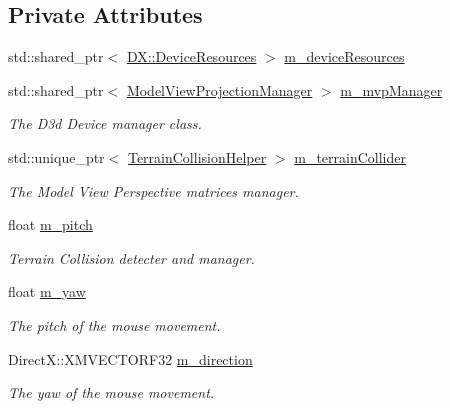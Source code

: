 \subsection*{Private Attributes}
\begin{DoxyCompactItemize}
\item 
std\+::shared\+\_\+ptr$<$ \mbox{\hyperlink{class_d_x_1_1_device_resources}{D\+X\+::\+Device\+Resources}} $>$ \mbox{\hyperlink{class_camera_helper_a68562f65262d3c90532df0a194624ec9}{m\+\_\+device\+Resources}}
\item 
std\+::shared\+\_\+ptr$<$ \mbox{\hyperlink{class_model_view_projection_manager}{Model\+View\+Projection\+Manager}} $>$ \mbox{\hyperlink{class_camera_helper_a10d96783299a8c958f84d46542a3d93f}{m\+\_\+mvp\+Manager}}
\begin{DoxyCompactList}\small\item\em The D3d Device manager class. \end{DoxyCompactList}\item 
std\+::unique\+\_\+ptr$<$ \mbox{\hyperlink{class_terrain_collision_helper}{Terrain\+Collision\+Helper}} $>$ \mbox{\hyperlink{class_camera_helper_a5ce949723d775603a605ffcd9cc68bbc}{m\+\_\+terrain\+Collider}}
\begin{DoxyCompactList}\small\item\em The Model View Perspective matrices manager. \end{DoxyCompactList}\item 
float \mbox{\hyperlink{class_camera_helper_ae2a32d581a829b05300d7298b5622469}{m\+\_\+pitch}}
\begin{DoxyCompactList}\small\item\em Terrain Collision detecter and manager. \end{DoxyCompactList}\item 
float \mbox{\hyperlink{class_camera_helper_a9bdda4839839b4329188fc44517e8b01}{m\+\_\+yaw}}
\begin{DoxyCompactList}\small\item\em The pitch of the mouse movement. \end{DoxyCompactList}\item 
Direct\+X\+::\+X\+M\+V\+E\+C\+T\+O\+R\+F32 \mbox{\hyperlink{class_camera_helper_af2822e6b05e48f33100c2f678e3776ce}{m\+\_\+direction}}
\begin{DoxyCompactList}\small\item\em The yaw of the mouse movement. \end{DoxyCompactList}\item 

\end{DoxyCompactItemize}
